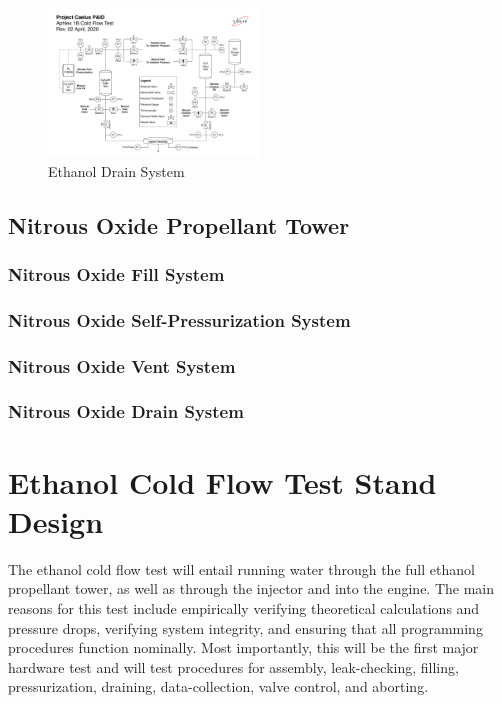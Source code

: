 \documentclass[9pt]{article} %
\numberwithin{equation}{section} %
\begin{document}
\begin{figure}[!htb] 
    \centering
    \includegraphics[scale=0.5, width=0.5\textwidth, trim={7cm 7cm 28cm 19.2cm}, clip]{Aphlex1B_04-02-2020_P&ID.pdf} %
    \caption{Ethanol Drain System}
    \label{fig:ethanol_drain_system}
\end{figure}

\subsection{Nitrous Oxide Propellant Tower}
\subsubsection{Nitrous Oxide Fill System}
\subsubsection{Nitrous Oxide Self-Pressurization System}
\subsubsection{Nitrous Oxide Vent System}
\subsubsection{Nitrous Oxide Drain System}

\section{Ethanol Cold Flow Test Stand Design}
\hspace{\parindent} The ethanol cold flow test will entail running water through the full ethanol propellant tower, as well as through the injector and into the engine. The main reasons for this test include empirically verifying theoretical calculations and pressure drops, verifying system integrity, and ensuring that all programming procedures function nominally. Most importantly, this will be the first major hardware test and will test procedures for assembly, leak-checking, filling, pressurization, draining, data-collection, valve control, and aborting.
\end{document}
